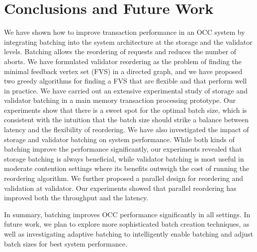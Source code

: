 \section{Conclusions and Future Work}\label{sec:conclusion}
We have shown how to improve transaction performance in an OCC system by integrating batching into the system architecture at the storage and the validator levels. Batching allows the reordering of requests and reduces the number of aborts. We have formulated validator reordering as the problem of finding the minimal feedback vertex set (FVS) in a directed graph, and we have proposed two greedy algorithms for finding a FVS that are flexible and that perform well in practice. We have carried out an extensive experimental study of storage and validator batching in a main memory transaction processing prototype. Our experiments show that there is a sweet spot for the optimal batch size, which is consistent with the intuition that the batch size should strike a balance between latency and the flexibility of reordering. We have also investigated the impact of storage and validator batching on system performance. While both kinds of batching improve the performance significantly, our experiments revealed that storage batching is always beneficial, while validator batching is most useful in moderate contention settings where its benefits outweigh the cost of running the reordering algorithm. We further proposed a parallel design for reordering and validation at validator. Our experiments showed that parallel reordering has improved both the throughput and the latency.

In summary, batching improves OCC performance significantly in all settings. In future work, we plan to explore more sophisticated batch creation techniques, as well as investigating adaptive batching to intelligently enable batching and adjust batch sizes for best system performance.


